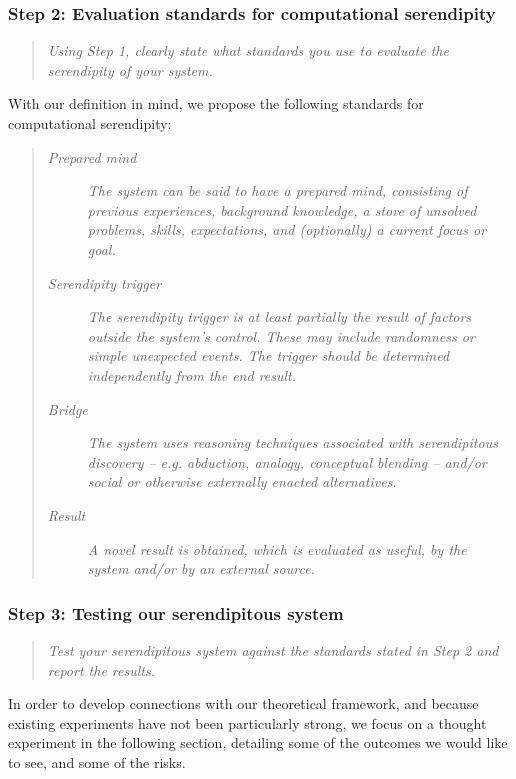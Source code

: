 \subsubsection*{ Step 2: Evaluation standards for computational serendipity}
\begin{quote} {\em Using Step 1, clearly state what standards you use to evaluate the serendipity of your
    system. }\end{quote}

With our definition in mind, we propose the following standards for
computational serendipity:

\begin{quote}
\begin{description}
\item[\emph{Prepared mind}] \emph{The system can be said to have a
  prepared mind, consisting of previous experiences, background
  knowledge, a store of unsolved problems, skills, expectations, and
  (optionally) a current focus or goal.}
\item[\emph{Serendipity trigger}] \emph{The serendipity trigger is at
  least partially the result of factors outside the system's control.
  These may include randomness or simple unexpected events.  The
  trigger should be determined independently from the end result.}
\item[\emph{Bridge}] \emph{The system uses reasoning techniques
  associated with serendipitous discovery -- e.g.  abduction, analogy,
  conceptual blending -- and/or social or otherwise externally enacted
  alternatives.}
\item[\emph{Result}] \emph{A novel result is obtained, which is
  evaluated as useful, by the system and/or by an external source.}
\end{description}
\end{quote}

\subsubsection*{Step 3: Testing our serendipitous system}

\begin{quote} {\em Test your serendipitous system against the standards stated in Step 2 and report the
results.}\end{quote}

In order to develop connections with our theoretical framework, and
because existing experiments have not been particularly strong, we
focus on a thought experiment in the following section, detailing some
of the outcomes we would like to see, and some of the risks.
